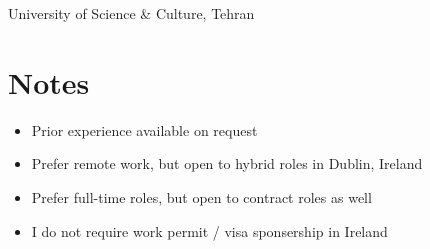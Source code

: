 \documentclass[10pt,a4paper]{article}
\begin{document}
University of Science \& Culture, Tehran


\section{Notes}

\begin{itemize}
\item{Prior experience available on request}
\item{Prefer remote work, but open to hybrid roles in Dublin, Ireland}
\item{Prefer full-time roles, but open to contract roles as well}
\item{I do not require work permit / visa sponsership in Ireland}
\end{itemize}
\end{document}
